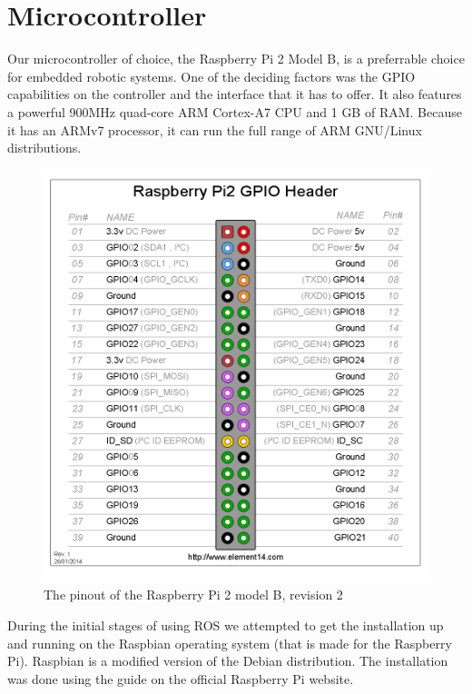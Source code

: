 \section{Microcontroller}

Our microcontroller of choice, the Raspberry Pi 2 Model B, is a preferrable choice for embedded robotic systems. One of the deciding factors was the GPIO capabilities on the controller and the interface that it has to offer. It also features a powerful 900MHz quad-core ARM Cortex-A7 CPU and 1 GB of RAM. Because it has an ARMv7 processor, it can run the full range of ARM GNU/Linux distributions.\cite{raspispecs}

\begin{figure}[H]
	\centering
	\includegraphics[scale=.4]{images/GPIO_Pi2.png}
	\caption{The pinout of the Raspberry Pi 2 model B, revision 2}
	\label{fig:gpioraspbi2}
\end{figure}

During the initial stages of using ROS we attempted to get the installation up and running on the Raspbian operating system (that is made for the Raspberry Pi). Raspbian is a modified version of the Debian distribution. The installation was done using the guide on the official Raspberry Pi website.\cite{raspiinstall}

